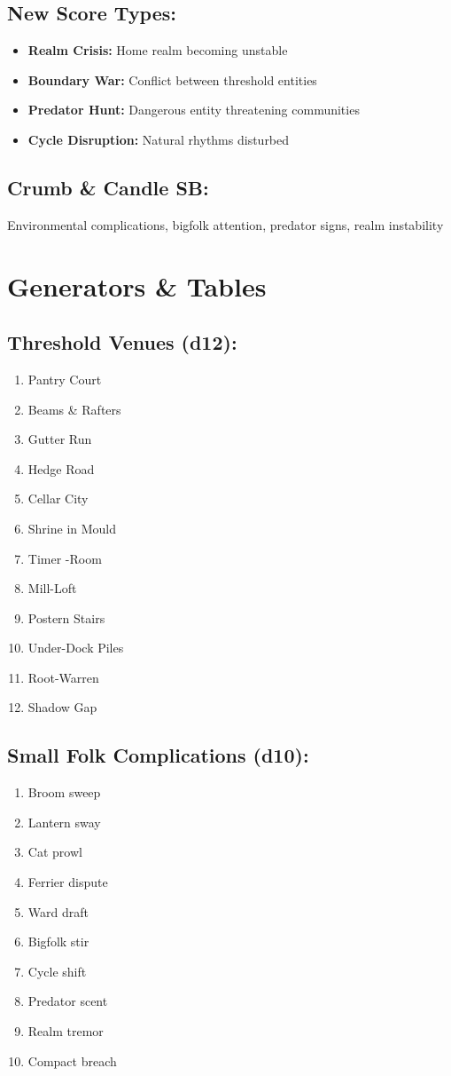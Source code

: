 \documentclass[11pt,letterpaper]{article}
\begin{document}
\subsection*{New Score Types:}
\begin{itemize}[leftmargin=*]
\item \textbf{Realm Crisis:} Home realm becoming unstable
\item \textbf{Boundary War:} Conflict between threshold entities
\item \textbf{Predator Hunt:} Dangerous entity threatening communities
\item \textbf{Cycle Disruption:} Natural rhythms disturbed
\end{itemize}

\subsection*{Crumb \& Candle SB:}
Environmental complications, bigfolk attention, predator signs, realm instability

\section{Generators \& Tables}

\subsection*{Threshold Venues (d12):}
\begin{enumerate}
\item Pantry Court  
\item Beams \& Rafters  
\item Gutter Run  
\item Hedge Road  
\item Cellar City  
\item Shrine in Mould
\item Timer -Room  
\item Mill-Loft  
\item Postern Stairs  
\item Under-Dock Piles  
\item Root-Warren  
\item Shadow Gap
\end{enumerate}

\subsection*{Small Folk Complications (d10):}
\begin{enumerate}
\item Broom sweep  
\item Lantern sway  
\item Cat prowl  
\item Ferrier dispute  
\item Ward draft
\item Bigfolk stir  
\item Cycle shift  
\item Predator scent  
\item Realm tremor  
\item Compact breach
\end{enumerate}
\end{document}
